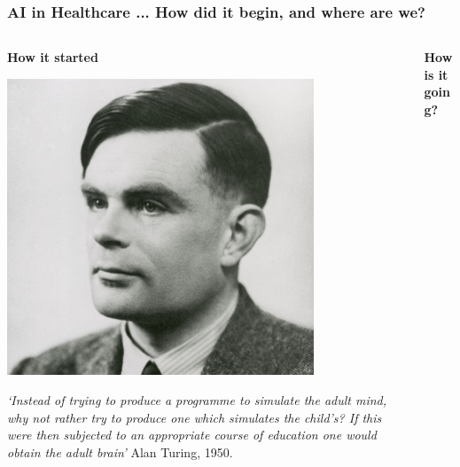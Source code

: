 \begin{frame}
\frametitle{AI in Healthcare ... How did it begin, and where are we?}
\begin{columns}
    \begin{column}{0.5\textwidth}
    \begin{center}
        \textbf{How it started}\\
        \vspace{2mm}
        
        \includegraphics[width=0.77\textwidth]{./images/alan_turing.jpg}
        
        \footnotesize{\textit{`Instead of trying to produce a programme to simulate the adult mind, why not rather try to produce one which simulates the child’s? If this were then subjected to an appropriate course of education one would obtain the adult brain'} Alan Turing, 1950.}
        
    \end{center}
        
    \end{column}

    \begin{column}{0.48\textwidth}
    \begin{center}
    \textbf{How is it going?}\\
    \vspace{2mm}
        

\end{center}
\end{column}
\end{columns}
\end{frame}

